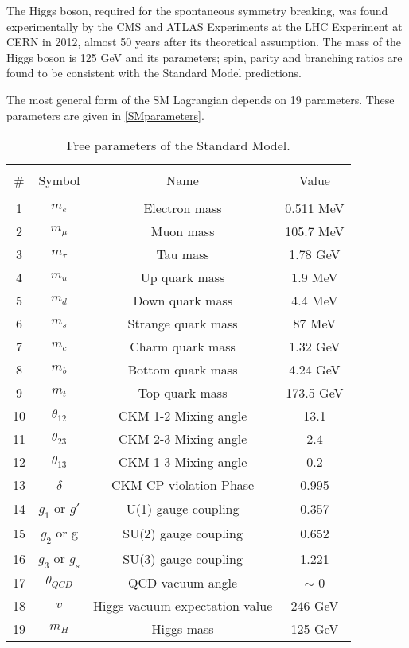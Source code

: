 The Higgs boson, required for the spontaneous symmetry breaking, was found experimentally by the CMS and ATLAS Experiments at the LHC Experiment at CERN\cite{HiggsCMS,HiggsATLAS} in 2012, almost 50 years after its theoretical assumption. The mass of the Higgs boson is 125 GeV and its parameters; spin, parity and branching ratios are found to be consistent with the Standard Model predictions\cite{Higgsprecision1, Higgsprecision2}.

The most general form of the SM Lagrangian depends on 19 parameters. These parameters are given in \autoref{SMparameters}.
\begin{table*}[ht]
	{\setlength{\tabcolsep}{14pt}
		\caption{Free parameters of the Standard Model.}
		\begin{center}
			\vspace{-6mm}
			\begin{tabular}{cccc}
				\hline \\[-2.45ex] \hline \\[-2.1ex]
				\# & Symbol & Name & Value \\
				\hline \\[-1.8ex]
				1 & $m_e$ & Electron mass & 0.511 MeV \\
				2 & $m_\mu$ & Muon mass & 105.7 MeV \\
				3 & $m_\tau$ & Tau mass & 1.78 GeV \\
				4 & $m_u$ & Up quark mass & 1.9 MeV \\
				5 & $m_d$ & Down quark mass & 4.4 MeV \\
				6 & $m_s$ & Strange quark mass & 87 MeV \\
				7 & $m_c$ & Charm quark mass & 1.32 GeV \\
				8 & $m_b$ & Bottom quark mass & 4.24 GeV \\
				9 & $m_t$ & Top quark mass & 173.5 GeV \\
				10 & $\theta_{12}$ & CKM 1-2 Mixing angle & 13.1\textdegree \\
				11 & $\theta_{23}$ & CKM 2-3 Mixing angle & 2.4\textdegree \\
				12 & $\theta_{13}$ & CKM 1-3 Mixing angle & 0.2\textdegree \\
				13 & $\delta$ & CKM CP violation Phase & 0.995 \\
				14 & $g_1$ or $g\prime$ & U(1) gauge coupling & 0.357 \\
				15 & $g_2$ or g & SU(2) gauge coupling & 0.652 \\
				16 & $g_3$ or $g_s$ & SU(3) gauge coupling & 1.221 \\
				17 & $\theta_{QCD}$ & QCD vacuum angle & $\sim $ 0 \\
				18 & $v$ & Higgs vacuum expectation value & 246 GeV \\
				19 & $m_H$ & Higgs mass & 125 GeV \\
				\hline
			\end{tabular}
			\vspace{-6mm}
		\end{center}
		\label{SMparameters}}
\end{table*}

